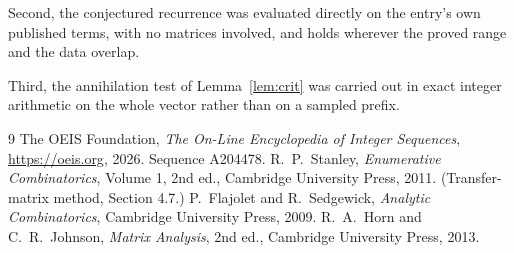 \documentclass[11pt,a4paper]{article}
\theoremstyle{plain}
\theoremstyle{definition}
\begin{document}
Second, the conjectured recurrence was evaluated directly on the entry's own published terms,
with no matrices involved, and holds wherever the proved range and the data overlap.

Third, the annihilation test of Lemma~\ref{lem:crit} was carried out in exact integer
arithmetic on the whole vector rather than on a sampled prefix.

\begin{thebibliography}{9}
 The OEIS Foundation, \emph{The On-Line Encyclopedia of Integer
Sequences}, \url{https://oeis.org}, 2026. Sequence A204478.
 R.~P.~Stanley, \emph{Enumerative Combinatorics}, Volume 1, 2nd ed.,
Cambridge University Press, 2011. (Transfer-matrix method, Section 4.7.)
 P.~Flajolet and R.~Sedgewick, \emph{Analytic Combinatorics}, Cambridge
University Press, 2009.
 R.~A.~Horn and C.~R.~Johnson, \emph{Matrix Analysis}, 2nd ed., Cambridge
University Press, 2013.
\end{thebibliography}
\end{document}
